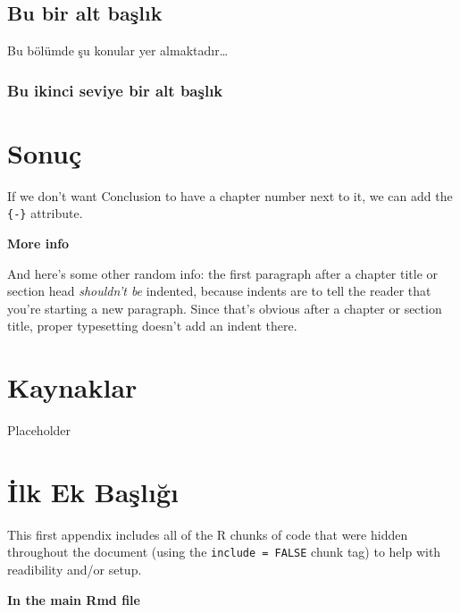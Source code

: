 \documentclass[12pt,twoside]{deuthesis}
\begin{document}
\hypertarget{bu-bir-alt-baux15flux131k-1}{%
\section{Bu bir alt başlık}\label{bu-bir-alt-baux15flux131k-1}}

Bu bölümde şu konular yer almaktadır\ldots{}

\hypertarget{bu-ikinci-seviye-bir-alt-baux15flux131k-1}{%
\subsection{Bu ikinci seviye bir alt başlık}\label{bu-ikinci-seviye-bir-alt-baux15flux131k-1}}

\hypertarget{sonuuxe7}{%
\chapter*{Sonuç}\label{sonuuxe7}}

If we don't want Conclusion to have a chapter number next to it, we can add the \texttt{\{-\}} attribute.

\textbf{More info}

And here's some other random info: the first paragraph after a chapter title or section head \emph{shouldn't be} indented, because indents are to tell the reader that you're starting a new paragraph. Since that's obvious after a chapter or section title, proper typesetting doesn't add an indent there.

\hypertarget{kaynaklar}{%
\chapter*{Kaynaklar}\label{kaynaklar}}

Placeholder

\appendix

\hypertarget{ilk-ek-baux15flux131ux11fux131}{%
\chapter{İlk Ek Başlığı}\label{ilk-ek-baux15flux131ux11fux131}}

This first appendix includes all of the R chunks of code that were hidden throughout the document (using the \texttt{include\ =\ FALSE} chunk tag) to help with readibility and/or setup.

\textbf{In the main Rmd file}
\end{document}
